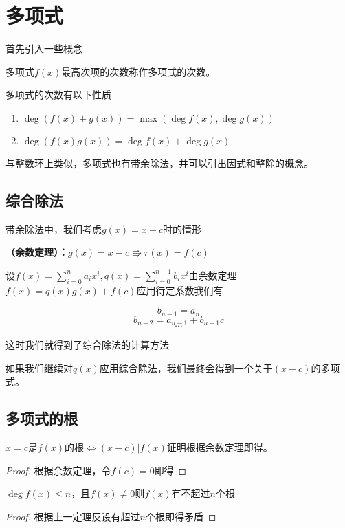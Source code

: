 \documentclass{ctexart}
\begin{document}
\section{多项式}

首先引入一些概念
\begin{definition}
    多项式$f(x)$最高次项的次数称作多项式的次数。
\end{definition}
多项式的次数有以下性质
\begin{enumerate}
    \item $\deg(f(x) \pm g(x)) = \max(\deg f(x) ,\deg g(x))$
    \item $\deg(f(x)g(x)) = \deg f(x) + \deg g(x)$
\end{enumerate}

与整数环上类似，多项式也有带余除法，并可以引出因式和整除的概念。

\subsection{综合除法}
带余除法中，我们考虑$g(x) = x - c$时的情形
\begin{theorem}
    \textbf{（余数定理）：}$g(x) = x - c \Rrightarrow r(x) = f(c)$
\end{theorem}
设$f(x) = \sum_{i = 0}^n a_i x^i , q(x) = \sum_{i = 0}^{n - 1} b_i x^i$由余数定理$f(x) = q(x) g(x) + f(c)$应用待定系数我们有

$$b_{n - 1} = a_n$$
$$b_{n - 2} = a_{n - 1} + b_{n - 1} c$$
$$\cdots$$

这时我们就得到了综合除法的计算方法

如果我们继续对$q(x)$应用综合除法，我们最终会得到一个关于$(x - c)$的多项式。

\subsection{多项式的根}

\begin{proposition}
    $x = c$是$f(x)$的根$\Leftrightarrow (x - c) | f(x)$证明根据余数定理即得。
\end{proposition}
\begin{proof}
    根据余数定理，令$f(c) = 0$即得
\end{proof}
\begin{proposition}
    $\deg f(x) \leq n$，且$f(x) \neq 0$则$f(x)$有不超过$n$个根 
\end{proposition}
\begin{proof}
    根据上一定理反设有超过$n$个根即得矛盾
\end{proof}
\end{document}
